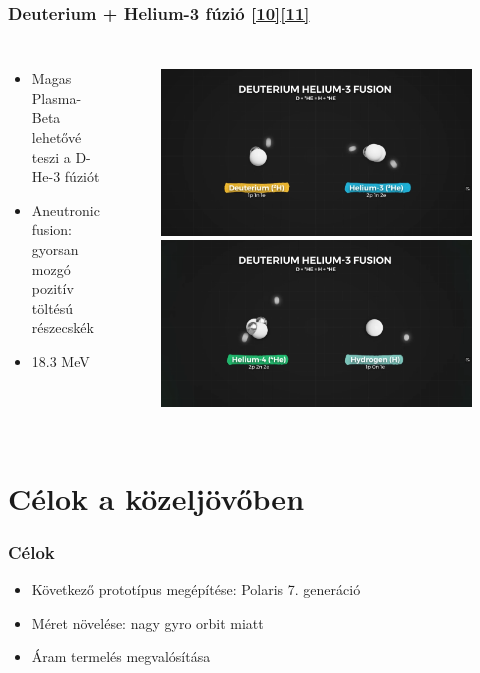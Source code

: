 \documentclass{beamer}
\begin{document}
\begin{frame}
    \frametitle{Deuterium + Helium-3 fúzió \hyperlink{10}{\small[10]}\hyperlink{11}{\small[11]}}
    \begin{columns}
        \begin{itemize}
            \item Magas Plasma-Beta lehetővé teszi a D-He-3 fúziót
            \item Aneutronic fusion: gyorsan mozgó pozitív töltésú részecskék
            \item 18.3 MeV
        \end{itemize}
        \begin{figure}
            \includegraphics[scale=0.09]{d_h3_fusion.png}
            \includegraphics[scale=0.09]{d_h3_fusion_2.png}
        \end{figure}   
    \end{columns}
\end{frame}

\section{Célok a közeljövőben}
\begin{frame}
    \frametitle{Célok}
    \begin{itemize}
        \item Következő prototípus megépítése: Polaris 7. generáció
        \item Méret növelése: nagy gyro orbit miatt
        \item Áram termelés megvalósítása
    \end{itemize} 
\end{frame}
\end{document}
